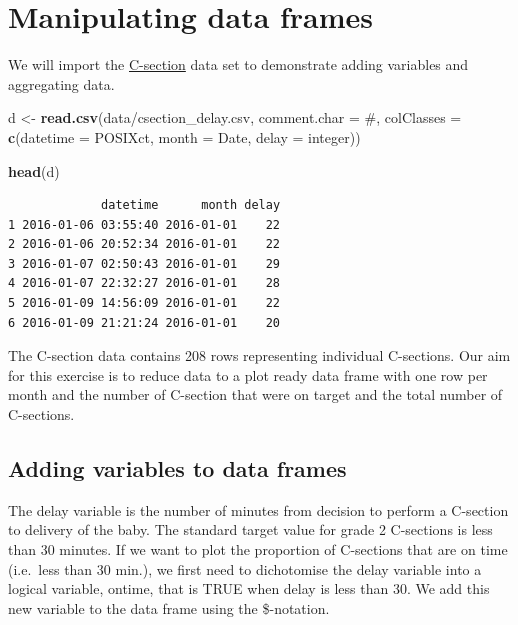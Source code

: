 \documentclass[
]{book}
\newenvironment{Shaded}{\begin{snugshade}}{\end{snugshade}}
\newcommand{\AttributeTok}[1]{\textcolor[rgb]{0.13,0.29,0.53}{#1}}
\newcommand{\FunctionTok}[1]{\textcolor[rgb]{0.13,0.29,0.53}{\textbf{#1}}}
\newcommand{\NormalTok}[1]{#1}
\newcommand{\OtherTok}[1]{\textcolor[rgb]{0.56,0.35,0.01}{#1}}
\newcommand{\StringTok}[1]{\textcolor[rgb]{0.31,0.60,0.02}{#1}}
\begin{document}
\section{Manipulating data frames}\label{manipulating-data-frames}

We will import the \hyperref[ceasearian-section-delay]{C-section} data set to demonstrate adding variables and aggregating data.

\begin{Shaded}
\begin{Highlighting}[]
\NormalTok{d }\OtherTok{\textless{}{-}} \FunctionTok{read.csv}\NormalTok{(}\StringTok{\textquotesingle{}data/csection\_delay.csv\textquotesingle{}}\NormalTok{,}
              \AttributeTok{comment.char =} \StringTok{\textquotesingle{}\#\textquotesingle{}}\NormalTok{,}
              \AttributeTok{colClasses   =} \FunctionTok{c}\NormalTok{(}\AttributeTok{datetime =} \StringTok{\textquotesingle{}POSIXct\textquotesingle{}}\NormalTok{,}
                               \AttributeTok{month    =} \StringTok{\textquotesingle{}Date\textquotesingle{}}\NormalTok{,}
                               \AttributeTok{delay    =} \StringTok{\textquotesingle{}integer\textquotesingle{}}\NormalTok{))}

\FunctionTok{head}\NormalTok{(d)}
\end{Highlighting}
\end{Shaded}

\begin{verbatim}
             datetime      month delay
1 2016-01-06 03:55:40 2016-01-01    22
2 2016-01-06 20:52:34 2016-01-01    22
3 2016-01-07 02:50:43 2016-01-01    29
4 2016-01-07 22:32:27 2016-01-01    28
5 2016-01-09 14:56:09 2016-01-01    22
6 2016-01-09 21:21:24 2016-01-01    20
\end{verbatim}

The C-section data contains 208 rows representing individual C-sections. Our aim for this exercise is to reduce data to a plot ready data frame with one row per month and the number of C-section that were on target and the total number of C-sections.

\subsection{Adding variables to data frames}\label{adding-variables-to-data-frames}

The delay variable is the number of minutes from decision to perform a C-section to delivery of the baby. The standard target value for grade 2 C-sections is less than 30 minutes. If we want to plot the proportion of C-sections that are on time (i.e.~less than 30 min.), we first need to dichotomise the delay variable into a logical variable, ontime, that is TRUE when delay is less than 30. We add this new variable to the data frame using the \$-notation.
\end{document}
